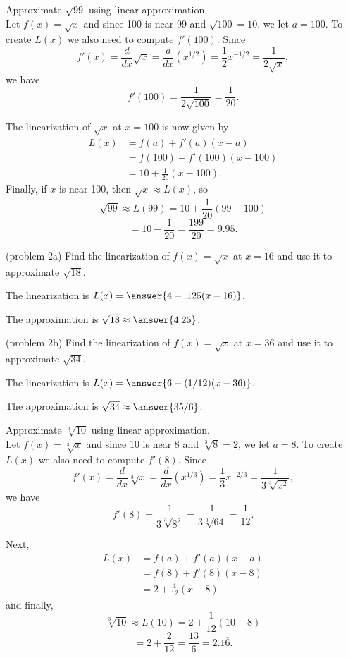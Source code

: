 \documentclass[handout]{ximera}
\begin{document}
\begin{example}[example 2]
Approximate $\sqrt{99}$ using linear approximation. \\
Let $f(x) = \sqrt x$ and since 100 is near 99 and $\sqrt{100} = 10$, we let 
$a = 100$. To create $L(x)$ we also need to compute $f'(100)$. 
Since 
\[f'(x) = \frac{d}{dx} \sqrt x = \frac{d}{dx}(x^{1/2})= \frac{1}{2}x^{-1/2}   = \frac{1}{2\sqrt x},\] 
we have
\[f'(100) = \frac{1}{2\sqrt{100}} = \frac{1}{20}.\]

The linearization of $\sqrt x$ at $x=100$ is now given by
\begin{align*}
L(x) &= f(a) + f'(a)(x - a) \\
&= f(100) + f'(100)(x - 100) \\
&= 10 + \frac{1}{20}(x - 100).
\end{align*}
Finally, if $x$ is near 100, then $\sqrt x \approx L(x)$, so
\[\sqrt{99} \approx L(99) = 10 + \frac{1}{20}(99 - 100)\]
\[ = 10 - \frac{1}{20} = \frac{199}{20} = 9.95.\]
\end{example}

\begin{problem}(problem 2a)
Find the linearization of $f(x) = \sqrt x$ at $x = 16$ and use it to approximate $\sqrt{18}$.

The linearization is  $L(x) = \answer{4 + .125 (x-16)}$.

The approximation is $\sqrt{18} \approx \answer{4.25}$.
\end{problem}

\begin{problem}(problem 2b)
Find the linearization of $f(x) = \sqrt x$ at $x = 36$ and use it to approximate $\sqrt{34}$.

The linearization is  $L(x) = \answer{6 + (1/12) (x-36)}$.

The approximation is $\sqrt{34} \approx \answer{35/6}$.
\end{problem}

\begin{example}[example 3]
Approximate $\sqrt[3]{10}$ using linear approximation.\\ 
Let $f(x) = \sqrt[3] x$ and since 10 is near 8 and $\sqrt[3]{8} = 2$, we let 
$a = 8$. To create $L(x)$ we also need to compute $f'(8)$. 
Since 
\[f'(x) = \frac{d}{dx} \sqrt[3] x = \frac{d}{dx}(x^{1/3})= \frac{1}{3}x^{-2/3}   = \frac{1}{3\sqrt[3] {x^2}},\] 
we have
\[f'(8) = \frac{1}{3\sqrt[3]{8^2}} =\frac{1}{3\sqrt[3]{64}}= \frac{1}{12}.\]

Next, 
\begin{align*}
L(x) &= f(a) + f'(a)(x - a) \\
&= f(8) + f'(8)(x - 8) \\
&= 2 + \frac{1}{12}(x - 8)
\end{align*}
and finally,
\[\sqrt[3]{10} \approx L(10) = 2 + \frac{1}{12}(10 - 8)\]
\[ = 2 + \frac{2}{12} = \frac{13}{6} = 2.1{\overline 6}.\]
\end{example}
\end{document}
